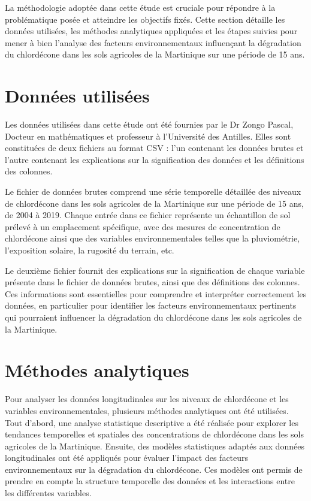 \documentclass{report}
\begin{document}
La méthodologie adoptée dans cette étude est cruciale pour répondre à la problématique posée et atteindre les objectifs fixés. Cette section détaille les données utilisées, les méthodes analytiques appliquées et les étapes suivies pour mener à bien l'analyse des facteurs environnementaux influençant la dégradation du chlordécone dans les sols agricoles de la Martinique sur une période de 15 ans.

\section{Données utilisées}

Les données utilisées dans cette étude ont été fournies par le Dr Zongo Pascal, Docteur en mathématiques et professeur à l'Université des Antilles. Elles sont constituées de deux fichiers au format CSV : l'un contenant les données brutes et l'autre contenant les explications sur la signification des données et les définitions des colonnes.

Le fichier de données brutes comprend une série temporelle détaillée des niveaux de chlordécone dans les sols agricoles de la Martinique sur une période de 15 ans, de 2004 à 2019. Chaque entrée dans ce fichier représente un échantillon de sol prélevé à un emplacement spécifique, avec des mesures de concentration de chlordécone ainsi que des variables environnementales telles que la pluviométrie, l'exposition solaire, la rugosité du terrain, etc.

Le deuxième fichier fournit des explications sur la signification de chaque variable présente dans le fichier de données brutes, ainsi que des définitions des colonnes. Ces informations sont essentielles pour comprendre et interpréter correctement les données, en particulier pour identifier les facteurs environnementaux pertinents qui pourraient influencer la dégradation du chlordécone dans les sols agricoles de la Martinique.
 
\section{Méthodes analytiques}

Pour analyser les données longitudinales sur les niveaux de chlordécone et les variables environnementales, plusieurs méthodes analytiques ont été utilisées. Tout d'abord, une analyse statistique descriptive a été réalisée pour explorer les tendances temporelles et spatiales des concentrations de chlordécone dans les sols agricoles de la Martinique. Ensuite, des modèles statistiques adaptés aux données longitudinales ont été appliqués pour évaluer l'impact des facteurs environnementaux sur la dégradation du chlordécone. Ces modèles ont permis de prendre en compte la structure temporelle des données et les interactions entre les différentes variables.
\end{document}
